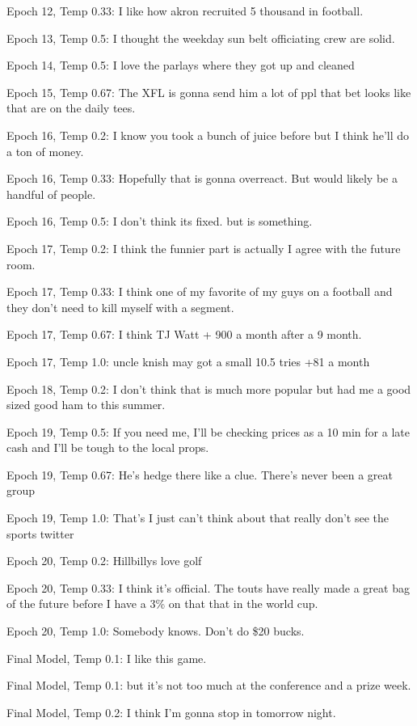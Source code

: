 \documentclass[5p,authoryear]{elsarticle}
\begin{document}
Epoch 12, Temp 0.33:
I like how akron recruited 5 thousand in football.

Epoch 13, Temp 0.5:
I thought the weekday sun belt officiating crew are solid.

Epoch 14, Temp 0.5:
I love the parlays where they got up and cleaned

Epoch 15, Temp 0.67:
The XFL is gonna send him a lot of ppl that bet looks like that are on the daily tees. 

Epoch 16, Temp 0.2:
I know you took a bunch of juice before but I think he’ll do a ton of money. 

Epoch 16, Temp 0.33:
Hopefully that is gonna overreact. But would likely be a handful of people. 

Epoch 16, Temp 0.5:
I don’t think its fixed. but is something.

Epoch 17, Temp 0.2:
I think the funnier part is actually I agree with the future room.

Epoch 17, Temp 0.33:
I think one of my favorite of my guys on a football and they don’t need to kill myself with a segment. 

Epoch 17, Temp 0.67:
I think TJ Watt + 900 a month after a 9 month. 

Epoch 17, Temp 1.0:
uncle knish may got a small 10.5 tries +81 a month 

Epoch 18, Temp 0.2:
I don’t think that is much more popular but had me a good sized good ham to this summer.

Epoch 19, Temp 0.5:
If you need me, I’ll be checking prices as a 10 min for a late cash and I’ll be tough to the local props. 

Epoch 19, Temp 0.67:
He’s hedge there like a clue. There’s never been a great group 

Epoch 19, Temp 1.0:
That’s I just can’t think about that really don’t see the sports twitter 

Epoch 20, Temp 0.2:
Hillbillys love golf

Epoch 20, Temp 0.33:
I think it’s official. The touts have really made a great bag of the future before I have a 3\% on that that in the world cup. 

Epoch 20, Temp 1.0:
Somebody knows. Don’t do \$20 bucks. 


Final Model, Temp 0.1: 
I like this game. 

Final Model, Temp 0.1: but it’s not too much at the conference and a prize week. 

Final Model, Temp 0.2: 
I think I’m gonna stop in tomorrow night.
\end{document}
